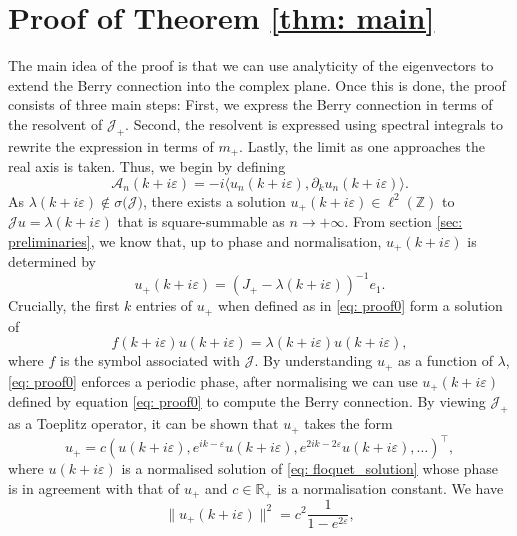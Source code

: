 \documentclass[a4paper,reqno,twoside]{amsart}
\numberwithin{equation}{section}
\theoremstyle{definition}
\newcommand{\<}{\ensuremath \leq}
\renewcommand{\>}{\ensuremath \geq}
\renewcommand{\epsilon}{\varepsilon}
\begin{document}
\section{Proof of Theorem \ref{thm: main}}\label{sec: proof}
The main idea of the proof is that we can use analyticity of the eigenvectors to extend the Berry connection into the complex plane. Once this is done, the proof consists of three main steps: First, we express the Berry connection in terms  of the resolvent of $\mathcal{J}_+$. Second, the resolvent is expressed using spectral integrals to rewrite the expression in terms of $m_+$. Lastly, the limit as one approaches the real axis is taken.
Thus, we begin by defining
\begin{equation*}
    \mathcal{A}_n(k + i\epsilon) = -i\langle u_n(k + i\epsilon),\partial_k u_n(k + i\epsilon)\rangle.
\end{equation*}
As $\lambda(k + i\epsilon)\notin\sigma(\mathcal{J)}$, there exists a solution $u_+(k+i\epsilon)\in\ell^2(\mathbb{Z})$ to $\mathcal{J}u =\lambda(k+i\epsilon)$ that is square-summable as $n\rightarrow+\infty$. From section \ref{sec: preliminaries}, we know that, up to phase and normalisation, $u_+(k + i\epsilon)$ is determined by
\begin{equation} \label{eq: proof0}
    u_+(k+i\epsilon) = (J_+-\lambda(k+i\epsilon))^{-1}e_1.
\end{equation}
Crucially, the first $k$ entries of $u_+$ when defined as in \eqref{eq: proof0} form a solution of 
\begin{equation}\label{eq: floquet_solution}
    f(k+i\epsilon)u(k+i\epsilon) =\lambda(k+i\epsilon)u(k+i\epsilon),
\end{equation}
where $f$ is the symbol associated with $\mathcal{J}$. By understanding $u_+$ as a function of $\lambda$, \eqref{eq: proof0} enforces a periodic phase, after normalising we can use $u_+(k+i\epsilon)$ defined by equation \eqref{eq: proof0} to compute the Berry connection. By viewing $\mathcal{J}_+$ as a Toeplitz operator, it can be shown that $u_+$ takes the form
\begin{equation}\label{eq: proof1}
    u_+ = c \left(u(k+i\epsilon), e^{ik -\epsilon} u(k+i\epsilon), e^{2ik -2\epsilon} u (k+i\epsilon),\dots\right)^\top,
\end{equation}
where $u (k+i\epsilon)$ is a normalised solution of \eqref{eq: floquet_solution} whose phase is in agreement with that of $u_+$ and $c\in \mathbb{R}_+$ is a normalisation constant. We have
\begin{equation}
     \lVert u_+(k+i\epsilon)\rVert^2 = c^2\frac{1}{1- e^{2\epsilon}},
\end{equation}
\end{document}

